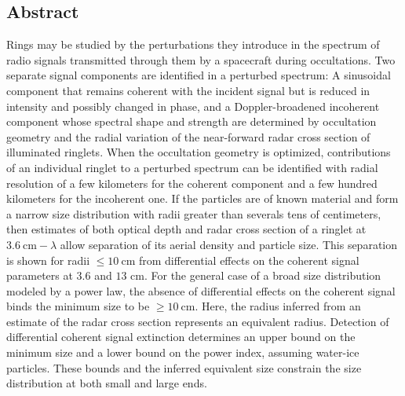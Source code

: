 \documentclass{article}
\theoremstyle{mystyle}
\begin{document}
\subsection{Abstract}
\noindent Rings may be studied by the perturbations they introduce in the spectrum of radio signals transmitted through them by a spacecraft during occultations. Two separate signal components are identified in a perturbed spectrum: A sinusoidal component that remains coherent with the incident signal but is reduced in intensity and possibly changed in phase, and a Doppler-broadened incoherent component whose spectral shape and strength are determined by occultation geometry and the radial variation of the near-forward radar cross section of illuminated ringlets. When the occultation geometry is optimized, contributions of an individual ringlet to a perturbed spectrum can be identified with radial resolution of a few kilometers for the coherent component and a few hundred kilometers for the incoherent one. If the particles are of known material and form a narrow size distribution with radii greater than severals tens of centimeters, then estimates of both optical depth and radar cross section of a ringlet at $3.6\ \textrm{cm}-\lambda$ allow separation of its aerial density and particle size. This separation is shown for radii $\leq 10\ \textrm{cm}$ from differential effects on the coherent signal parameters at $3.6$ and $13$ cm. For the general case of a broad size distribution modeled by a power law, the absence of differential effects on the coherent signal binds the minimum size to be $\geq 10\ \textrm{cm}$. Here, the radius inferred from an estimate of the radar cross section represents an equivalent radius. Detection of differential coherent signal extinction determines an upper bound on the minimum size and a lower bound on the power index, assuming water-ice particles. These bounds and the inferred equivalent size constrain the size distribution at both small and large ends.
\end{document}
